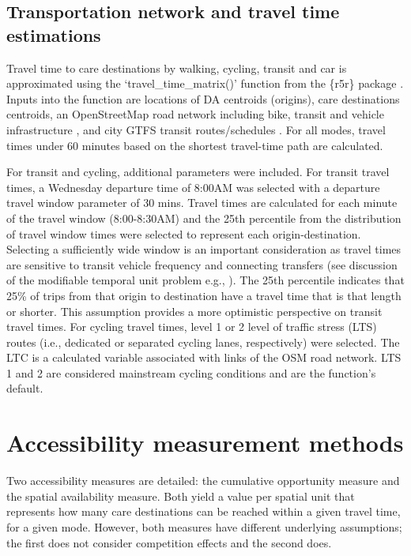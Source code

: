 \documentclass[
  authoryear,
  preprint,
  3p]{elsarticle}
\begin{document}
\subsection{Transportation network and travel time
estimations}\label{transportation-network-and-travel-time-estimations}

Travel time to care destinations by walking, cycling, transit and car is
approximated using the `travel\_time\_matrix()' function from the
\{r5r\} package \citep{pereiraR5rRapidRealistic2021}. Inputs into the
function are locations of DA centroids (origins), care destinations
centroids, an OpenStreetMap road network including bike, transit and
vehicle infrastructure \citep{geofabrikOntarioCanadaOpen2023}, and city
GTFS transit routes/schedules
\citep{transitfeedsHamiltonStreetRailway2023}. For all modes, travel
times under 60 minutes based on the shortest travel-time path are
calculated.

For transit and cycling, additional parameters were included. For
transit travel times, a Wednesday departure time of 8:00AM was selected
\citep{boisjolyDailyFluctuationsTransit2016} with a departure travel
window parameter of 30 mins. Travel times are calculated for each minute
of the travel window (8:00-8:30AM) and the 25th percentile from the
distribution of travel window times were selected to represent each
origin-destination. Selecting a sufficiently wide window is an important
consideration as travel times are sensitive to transit vehicle frequency
and connecting transfers (see discussion of the modifiable temporal unit
problem e.g., \citep{pereiraFutureAccessibilityImpacts2019}). The 25th
percentile indicates that 25\% of trips from that origin to destination
have a travel time that is that length or shorter. This assumption
provides a more optimistic perspective on transit travel times. For
cycling travel times, level 1 or 2 level of traffic stress (LTS) routes
(i.e., dedicated or separated cycling lanes, respectively) were
selected. The LTC is a calculated variable associated with links of the
OSM road network. LTS 1 and 2 are considered mainstream cycling
conditions \citep{faghihimaniCycleAccessibilityLevel2019} and are the
function's default.

\section{Accessibility measurement
methods}\label{accessibility-measurement-methods}

Two accessibility measures are detailed: the cumulative opportunity
measure and the spatial availability measure. Both yield a value per
spatial unit that represents how many care destinations can be reached
within a given travel time, for a given mode. However, both measures
have different underlying assumptions; the first does not consider
competition effects and the second does.
\end{document}
